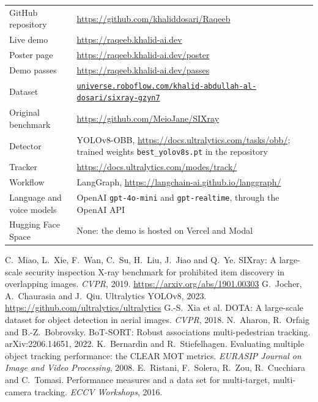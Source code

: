 \documentclass[11pt,a4paper]{article}
\newcommand{\code}[1]{\texttt{#1}}
\begin{document}
\begin{table}[H]
\centering
\small
\begin{tabularx}{\textwidth}{@{}P{3.8cm}L@{}}
\toprule
GitHub repository & \url{https://github.com/khaliddosari/Raqeeb} \\
Live demo & \url{https://raqeeb.khalid-ai.dev} \\
Poster page & \url{https://raqeeb.khalid-ai.dev/poster} \\
Demo passes & \url{https://raqeeb.khalid-ai.dev/passes} \\
Dataset & \href{https://universe.roboflow.com/khalid-abdullah-al-dosari/sixray-gzyn7}{\nolinkurl{universe.roboflow.com/khalid-abdullah-al-dosari/sixray-gzyn7}} \\
Original benchmark & \url{https://github.com/MeioJane/SIXray} \\
Detector & YOLOv8-OBB, \url{https://docs.ultralytics.com/tasks/obb/}; trained weights
\code{best\_yolov8s.pt} in the repository \\
Tracker & \url{https://docs.ultralytics.com/modes/track/} \\
Workflow & LangGraph, \url{https://langchain-ai.github.io/langgraph/} \\
Language and voice models & OpenAI \code{gpt-4o-mini} and \code{gpt-realtime}, through the OpenAI API \\
Hugging Face Space & None: the demo is hosted on Vercel and Modal \\
\bottomrule
\end{tabularx}
\end{table}

\begin{thebibliography}{9}
\footnotesize
\setlength{\itemsep}{0.1em}
 C.~Miao, L.~Xie, F.~Wan, C.~Su, H.~Liu, J.~Jiao and Q.~Ye. SIXray: A large-scale
security inspection X-ray benchmark for prohibited item discovery in overlapping images. \emph{CVPR}, 2019.
\url{https://arxiv.org/abs/1901.00303}
 G.~Jocher, A.~Chaurasia and J.~Qiu. Ultralytics YOLOv8, 2023.
\url{https://github.com/ultralytics/ultralytics}
 G.-S.~Xia et al. DOTA: A large-scale dataset for object detection in aerial images.
\emph{CVPR}, 2018.
 N.~Aharon, R.~Orfaig and B.-Z.~Bobrovsky. BoT-SORT: Robust associations
multi-pedestrian tracking. arXiv:2206.14651, 2022.
 K.~Bernardin and R.~Stiefelhagen. Evaluating multiple object tracking performance:
the CLEAR MOT metrics. \emph{EURASIP Journal on Image and Video Processing}, 2008.
 E.~Ristani, F.~Solera, R.~Zou, R.~Cucchiara and C.~Tomasi. Performance measures and a
data set for multi-target, multi-camera tracking. \emph{ECCV Workshops}, 2016.
\end{thebibliography}
\end{document}
